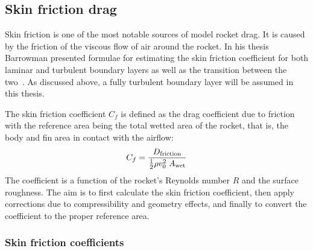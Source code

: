 

\subsection{Skin friction drag}

Skin friction is one of the most notable sources of model rocket
drag.  It is caused by the friction of the viscous flow of air
around the rocket.  In his thesis Barrowman presented formulae for
estimating the skin friction coefficient for both laminar and
turbulent boundary layers as well as the transition between the
two~\cite[pp.~43--47]{barrowman-thesis}.  As discussed above, a fully
turbulent boundary layer will be assumed in this thesis.


The skin friction coefficient $C_f$ is defined as the drag coefficient
due to friction with the reference area being the total wetted area
of the rocket, that is, the body and fin area in contact with the
airflow:
%
\begin{equation}
C_f = \frac{D_{\rm friction}}{\frac{1}{2} \rho v_0^2\;A_{\rm wet}}
\end{equation}
%
The coefficient is a function of the rocket's Reynolds number $R$ and
the surface roughness.
%
%
The aim is to first calculate the skin friction coefficient,
then apply corrections due to compressibility and geometry effects,
and finally to convert the coefficient to the proper reference area.


\subsubsection{Skin friction coefficients}
\label{sec-skin-friction-coefficient}

